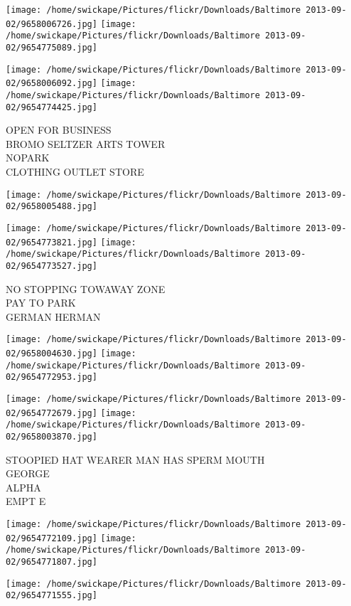 \documentclass[10pt,letterpaper]{article}
\begin{document}
\texttt{[image: /home/swickape/Pictures/flickr/Downloads/Baltimore 2013-09-02/9658006726.jpg]}
\texttt{[image: /home/swickape/Pictures/flickr/Downloads/Baltimore 2013-09-02/9654775089.jpg]}

\texttt{[image: /home/swickape/Pictures/flickr/Downloads/Baltimore 2013-09-02/9658006092.jpg]}
\texttt{[image: /home/swickape/Pictures/flickr/Downloads/Baltimore 2013-09-02/9654774425.jpg]}

OPEN FOR BUSINESS\\
BROMO SELTZER ARTS TOWER\\
NOPARK\\
CLOTHING OUTLET STORE
\pagebreak

\texttt{[image: /home/swickape/Pictures/flickr/Downloads/Baltimore 2013-09-02/9658005488.jpg]}

\vspace{0.25in}
\texttt{[image: /home/swickape/Pictures/flickr/Downloads/Baltimore 2013-09-02/9654773821.jpg]}
\texttt{[image: /home/swickape/Pictures/flickr/Downloads/Baltimore 2013-09-02/9654773527.jpg]}

NO STOPPING TOWAWAY ZONE\\
PAY TO PARK\\
GERMAN HERMAN
\pagebreak

\texttt{[image: /home/swickape/Pictures/flickr/Downloads/Baltimore 2013-09-02/9658004630.jpg]}
\texttt{[image: /home/swickape/Pictures/flickr/Downloads/Baltimore 2013-09-02/9654772953.jpg]}

\texttt{[image: /home/swickape/Pictures/flickr/Downloads/Baltimore 2013-09-02/9654772679.jpg]}
\texttt{[image: /home/swickape/Pictures/flickr/Downloads/Baltimore 2013-09-02/9658003870.jpg]}

STOOPIED HAT WEARER MAN HAS SPERM MOUTH\\
GEORGE\\
ALPHA\\
EMPT E
\pagebreak

\texttt{[image: /home/swickape/Pictures/flickr/Downloads/Baltimore 2013-09-02/9654772109.jpg]}
\texttt{[image: /home/swickape/Pictures/flickr/Downloads/Baltimore 2013-09-02/9654771807.jpg]}

\texttt{[image: /home/swickape/Pictures/flickr/Downloads/Baltimore 2013-09-02/9654771555.jpg]}
\end{document}
